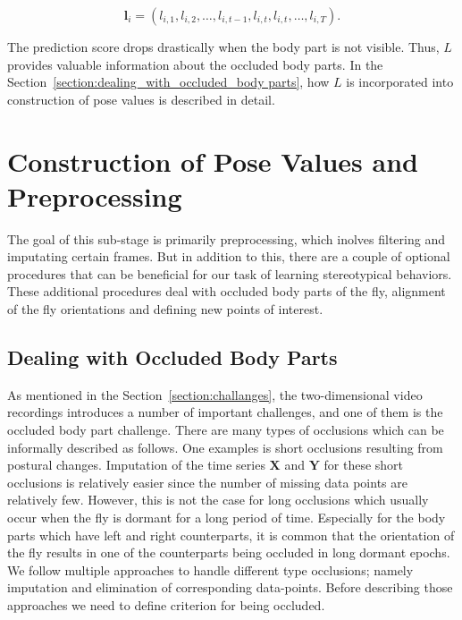\begin{equation*}
	\mathbf{l}_i = (l_{i,1}, l_{i,2}, \dots, l_{i,t-1}, l_{i,t}, l_{i,t}, \dots, l_{i,T}).
\end{equation*}

The prediction score drops drastically when the body part is not visible. Thus, $L$ provides valuable information about the occluded body parts. In the Section~\ref{section:dealing_with_occluded_body parts}, how $L$ is incorporated into construction of pose values is described in detail.

\section{Construction of Pose Values and Preprocessing}
The goal of this sub-stage is primarily preprocessing, which inolves filtering and imputating certain frames.
But in addition to this, there are a couple of optional procedures that can be beneficial for our task of learning stereotypical behaviors.
These additional procedures deal with occluded body parts of the fly, alignment of the fly orientations and defining new points of interest.

\subsection{Dealing with Occluded Body Parts}\label{section:dealing_with_occluded_body-parts}
As mentioned in the Section~\ref{section:challanges}, the two-dimensional video recordings introduces a number of important challenges, and one of them is the occluded body part challenge.
There are many types of occlusions which can be informally described as follows.
One examples is short occlusions resulting from postural changes.
Imputation of the time series $\mathbf{X}$ and $\mathbf{Y}$ for these short occlusions is relatively easier since the number of missing data points are relatively few.
However, this is not the case for long occlusions which usually occur when the fly is dormant for a long period of time.
Especially for the body parts which have left and right counterparts, it is common that the orientation of the fly results in one of the counterparts being occluded in long dormant epochs.
We follow multiple approaches to handle different type occlusions; namely imputation and elimination of corresponding data-points.
Before describing those approaches we need to define criterion for being occluded.

